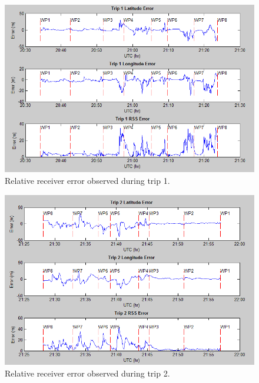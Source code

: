 \documentclass[]{aiaa-tc}%
\begin{document}
	\begin{figure}[H]
		\centering
		\includegraphics[width = 13cm]{Trip1Err.PNG}
		\caption{Relative receiver error observed during trip 1. }
		\label{fig:Trip1Err}
	\end{figure}
	
	\begin{figure}[H]
		\centering
		\includegraphics[width = 13cm]{Trip2Err.PNG}
		\caption{Relative receiver error observed during trip 2. }
		\label{fig:Trip2Err}
	\end{figure}
		
\end{document}
